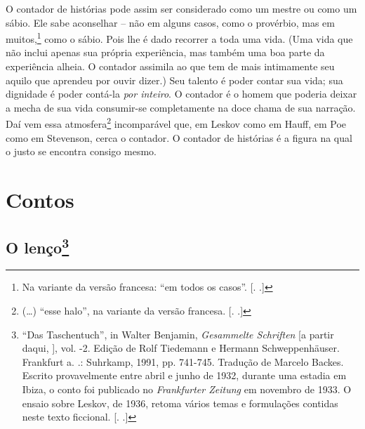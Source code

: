 O contador de histórias pode assim ser considerado como um mestre ou
como um sábio. Ele sabe aconselhar -- não em alguns casos, como o
provérbio, mas em muitos,\footnote{Na variante da versão francesa: ``em
  todos os casos''. [. .]} como o sábio. Pois lhe é dado
recorrer a toda uma vida. (Uma vida que não inclui apenas sua própria
experiência, mas também uma boa parte da experiência alheia. O contador
assimila ao que tem de mais intimamente seu aquilo que aprendeu por
ouvir dizer.) Seu talento é poder contar sua vida; sua dignidade é poder
contá-la \emph{por inteiro}. O contador é o homem que poderia deixar a
mecha de sua vida consumir-se completamente na doce chama de sua
narração. Daí vem essa atmosfera\footnote{(\ldots{}) ``esse halo'', na variante da
  versão francesa. [. .]} incomparável que, em Leskov como em
Hauff, em Poe como em Stevenson, cerca o contador. O contador de
histórias é a figura na qual o justo se encontra consigo mesmo\label{supra4}.

\part{Contos}

\chapter{O lenço\footnote[*]{``Das Taschentuch'', in Walter Benjamin,
  \emph{Gesammelte Schriften} [a partir daqui, ], vol. -2.
  Edição de Rolf Tiedemann e Hermann Schweppenhäuser. Frankfurt a. .:
  Suhrkamp, 1991, pp. 741-745. Tradução de Marcelo Backes. Escrito
  provavelmente entre abril e junho de 1932, durante uma estadia em
  Ibiza, o conto foi publicado no \emph{Frankfurter Zeitung} em novembro
  de 1933. O ensaio sobre Leskov, de 1936, retoma vários temas e
  formulações contidas neste texto ficcional. [. .]}}

